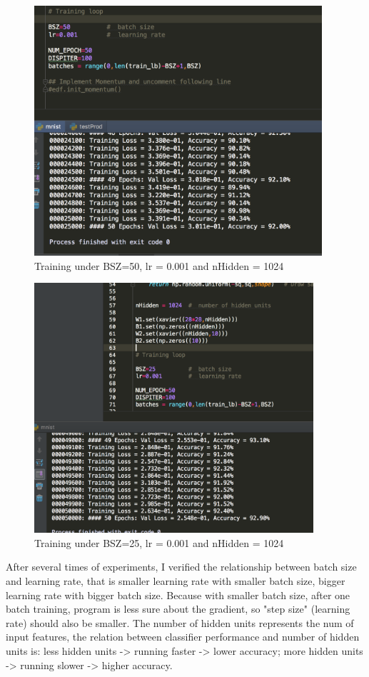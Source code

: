 \documentclass{article}
\begin{document}
\begin{figure}[h!]
  \centering
	\includegraphics[height=25em]{screenshots/prob2(a)50-0001-1024.png}
	\caption{Training under BSZ=50, lr = 0.001 and nHidden = 1024}
\end{figure}
\begin{figure}[h!]
  \centering
	\includegraphics[height=25em]{screenshots/prob2(a)25-0001-1024.png}
	\caption{Training under BSZ=25, lr = 0.001 and nHidden = 1024}
\end{figure}

\newpage
After several times of experiments, I verified the relationship between batch size and learning rate, that is smaller learning rate with smaller batch size, bigger learning rate with bigger batch size. Because with smaller batch size, after one batch training, program is less sure about the gradient, so "step size" (learning rate) should also be smaller. The number of hidden units represents the num of input features, the relation between classifier performance and number of hidden units is: less hidden units -> running faster -> lower accuracy; more hidden units -> running slower -> higher accuracy.
\end{document}
